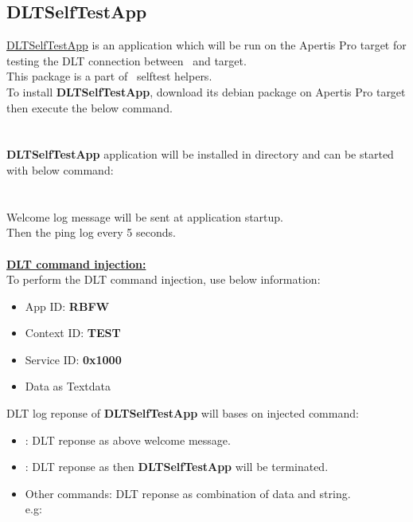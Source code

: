 \subsection{DLTSelfTestApp}
\href{https://sourcecode.socialcoding.bosch.com/projects/ROBFW/repos/selftest/browse/helpers/DLT}
{DLTSelfTestApp} is an application which will be run on the Apertis Pro target for 
testing the DLT connection between \rfw\ and target.\\
This package is a part of \rfw\ selftest helpers.\\
To install \textbf{DLTSelfTestApp}, download its debian package on Apertis Pro
target then execute the below command.\\
\\
\\
\textbf{DLTSelfTestApp} application will be installed in 
 directory and can be started with below command:\\
\\
\\
Welcome log message  
will be sent at application startup.\\
Then the ping log  
every 5 seconds.\\
\\
\textbf{\underline{DLT command injection:}}\\
To perform the DLT command injection, use below information:
\begin{itemize}
   \item App ID: \textbf{RBFW}
   \item Context ID: \textbf{TEST}
   \item Service ID: \textbf{0x1000}
   \item Data as Textdata
\end{itemize}

DLT log reponse of \textbf{DLTSelfTestApp} will bases on injected command:
\begin{itemize}
   \item {}: DLT reponse as above welcome message.
   \item {}: DLT reponse as  then \textbf{DLTSelfTestApp} 
                       will be terminated.
   \item Other commands: DLT reponse as combination of data and string.\\
   e.g: 
\end{itemize}

